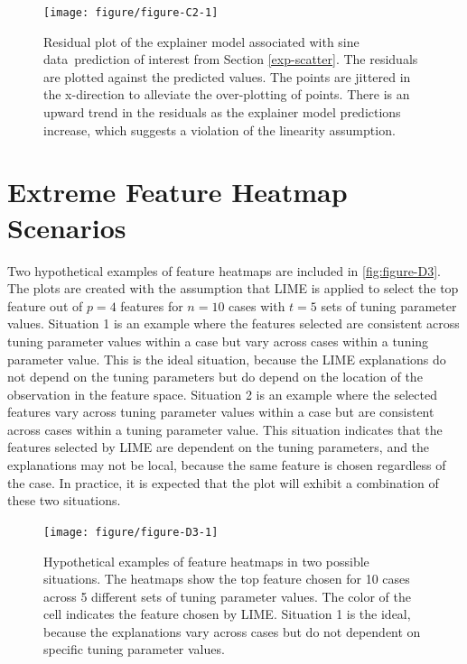 \documentclass[AMS,STIX2COL]{WileyNJD-v2}\usepackage[]{graphicx}\usepackage[]{color}
\newenvironment{knitrout}{}{} %
\newcommand{\data}{sine data}
\begin{document}
\begin{figure}[!thp]
\begin{knitrout}
\color{fgcolor}

{\centering \texttt{[image: figure/figure-C2-1]} 

}



\end{knitrout}
\caption{Residual plot of the explainer model associated with \data \ prediction of interest from Section \ref{exp-scatter}. The residuals are plotted against the predicted values. The points are jittered in the x-direction to alleviate the over-plotting of points. There is an upward trend in the residuals as the explainer model predictions increase, which suggests a violation of the linearity assumption.}
\label{fig:figure-C2}
\end{figure}

\section{Extreme Feature Heatmap Scenarios} \label{feat-heat-ex}

Two hypothetical examples of feature heatmaps are included in \autoref{fig:figure-D3}. The plots are created with the assumption that LIME is applied to select the top feature out of $p=4$  features for $n=10$ cases with $t=5$ sets of tuning parameter values. Situation 1 is an example where the features selected are consistent across tuning parameter values within a case but vary across cases within a tuning parameter value. This is the ideal situation, because the LIME explanations do not depend on the tuning parameters but do depend on the location of the observation in the feature space. Situation 2 is an example where the selected features vary across tuning parameter values within a case but are consistent across cases within a tuning parameter value. This situation indicates that the features selected by LIME are dependent on the tuning parameters, and the explanations may not be  local, because the same feature is chosen regardless of the case. In practice, it is expected that the plot will exhibit a combination of these two situations.

\begin{figure}[!thp]
\begin{knitrout}
\color{fgcolor}

{\centering \texttt{[image: figure/figure-D3-1]} 

}



\end{knitrout}
\caption{Hypothetical examples of feature heatmaps in two possible situations. The heatmaps show the top feature chosen for 10 cases across 5 different sets of tuning parameter values. The color of the cell indicates the feature chosen by LIME. Situation 1 is the ideal, because the explanations vary across cases but do not dependent on specific tuning parameter values.}
\label{fig:figure-D3}
\end{figure}
\end{document}
